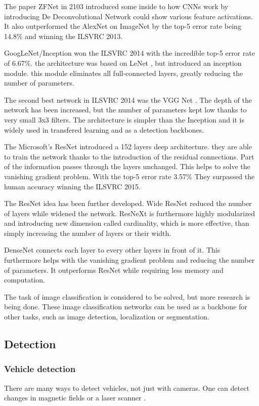 \documentclass[a4paper,12pt,titlepage, twoside]{article}
\numberwithin{figure}{section}
\begin{document}
The paper ZFNet \cite{zeiler2014visualizing} in 2103 introduced some inside to how CNNs work by introducing De Deconvolutional Network could show various feature activations. It also outperformed the AlexNet on ImageNet by the top-5 error rate being 14.8\% and winning the ILSVRC 2013.

GoogLeNet/Inception won the ILSVRC 2014 with the incredible top-5 error rate of 6.67\%. the architecture was based on LeNet \cite{lecun1998gradient}, but introduced an inception module. this module eliminates all full-connected layers, greatly reducing the number of parameters.

The second best network in ILSVRC 2014 was the VGG Net \cite{simonyan2014very}. The depth of the network has been increased, but the number of parameters kept low thanks to very small 3x3 filters. The architecture is simpler than the Inception and it is widely used in transfered learning and as a detection backbones.

The Microsoft's ResNet\cite{he2016deep} introduced a 152 layers deep architecture. they are able to train the network thanks to the introduction of the residual connections. Part of the information passes through the layers unchanged. This helps to solve the vanishing gradient problem. With the top-5 error rate 3.57\% They surpassed the human accuracy winning the ILSVRC 2015.

The ResNet idea has been further developed. Wide ResNet\cite{zagoruyko2016wide} reduced the number of layers while widened the network. ResNeXt \cite{xie2017aggregated} is furthermore highly modularized and introducing new dimension called cardinality, which is more effective, than simply increasing the number of layers or their width. 

DenseNet \cite{huang2017densely} connects each layer to every other layers in front of it. This furthermore helps with the vanishing gradient problem and reducing the number of parameters. It outperforms ResNet while requiring less memory and computation.

The task of image classification is considered to be solved, but more research is being done. These image classification networks can be used as a backbone for other tasks, such as image detection, localization or segmentation.

\subsection{Detection}
\subsubsection{Vehicle detection}
There are many ways to detect vehicles, not just with cameras. One can detect changes in magnetic fields \cite{daubaras2012vehicle, caruso1999vehicle} or a laser scanner \cite{gate2009fast}.
\end{document}
